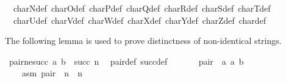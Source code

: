 \begin{isabellebody}
\ \ char{\isacharprime}{\kern0pt}N{\isacharprime}{\kern0pt}{\isacharunderscore}{\kern0pt}def\ char{\isacharprime}{\kern0pt}O{\isacharprime}{\kern0pt}{\isacharunderscore}{\kern0pt}def\ char{\isacharprime}{\kern0pt}P{\isacharprime}{\kern0pt}{\isacharunderscore}{\kern0pt}def\ char{\isacharprime}{\kern0pt}Q{\isacharprime}{\kern0pt}{\isacharunderscore}{\kern0pt}def\ char{\isacharprime}{\kern0pt}R{\isacharprime}{\kern0pt}{\isacharunderscore}{\kern0pt}def\ char{\isacharprime}{\kern0pt}S{\isacharprime}{\kern0pt}{\isacharunderscore}{\kern0pt}def\ char{\isacharprime}{\kern0pt}T{\isacharprime}{\kern0pt}{\isacharunderscore}{\kern0pt}def\isanewline
\ \ char{\isacharprime}{\kern0pt}U{\isacharprime}{\kern0pt}{\isacharunderscore}{\kern0pt}def\ char{\isacharprime}{\kern0pt}V{\isacharprime}{\kern0pt}{\isacharunderscore}{\kern0pt}def\ char{\isacharprime}{\kern0pt}W{\isacharprime}{\kern0pt}{\isacharunderscore}{\kern0pt}def\ char{\isacharprime}{\kern0pt}X{\isacharprime}{\kern0pt}{\isacharunderscore}{\kern0pt}def\ char{\isacharprime}{\kern0pt}Y{\isacharprime}{\kern0pt}{\isacharunderscore}{\kern0pt}def\ char{\isacharprime}{\kern0pt}Z{\isacharprime}{\kern0pt}{\isacharunderscore}{\kern0pt}def\ char{\isacharprime}{\kern0pt}{\isacharunderscore}{\kern0pt}{\isacharprime}{\kern0pt}{\isacharunderscore}{\kern0pt}def%
\begin{isamarkuptext}%
The following lemma is used to prove distinctness of non-identical strings.%
\end{isamarkuptext}\isamarkuptrue%
\isamarkupfalse%
\ pair{\isacharunderscore}{\kern0pt}ne{\isacharunderscore}{\kern0pt}succ{\isacharcolon}{\kern0pt}\ {\isachardoublequoteopen}{\isasymlangle}a{\isacharcomma}{\kern0pt}\ b{\isasymrangle}\ {\isasymnoteq}\ succ\ n{\isachardoublequoteclose}\ %
\isanewline
%
\isadelimproof
%
\endisadelimproof
%
\isatagproof
{}\isamarkupfalse%
\ pair{\isacharunderscore}{\kern0pt}def\ succ{\isacharunderscore}{\kern0pt}def\isanewline
{}\isamarkupfalse%
\isanewline
\ \ \isamarkupfalse%
\isanewline
\ \ \ \ {\isacharquery}{\kern0pt}pair\ {\isacharequal}{\kern0pt}\ {\isachardoublequoteopen}{\isacharbraceleft}{\kern0pt}{\isacharbraceleft}{\kern0pt}a{\isacharbraceright}{\kern0pt}{\isacharcomma}{\kern0pt}\ {\isacharbraceleft}{\kern0pt}a{\isacharcomma}{\kern0pt}\ b{\isacharbraceright}{\kern0pt}{\isacharbraceright}{\kern0pt}{\isachardoublequoteclose}\isanewline
\ \ \isamarkupfalse%
\isanewline
\ \ \ \ asm{\isacharcolon}{\kern0pt}\ {\isachardoublequoteopen}{\isacharquery}{\kern0pt}pair\ {\isacharequal}{\kern0pt}\ n\ {\isasymunion}\ {\isacharbraceleft}{\kern0pt}n{\isacharbraceright}{\kern0pt}{\isachardoublequoteclose}\isanewline

\end{isabellebody}
